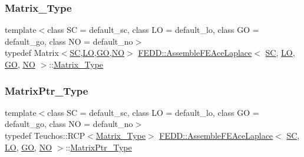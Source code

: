 \subsubsection{\texorpdfstring{Matrix\+\_\+\+Type}{Matrix\_Type}}
{\footnotesize\ttfamily template$<$class SC  = default\+\_\+sc, class LO  = default\+\_\+lo, class GO  = default\+\_\+go, class NO  = default\+\_\+no$>$ \\
typedef Matrix$<$\hyperlink{fe__test__laplace_8cpp_a79c7e86a57edbb2a5a53242bcd04e41e}{SC},\hyperlink{fe__test__laplace_8cpp_ad6a38c9f07d3fd633eefca5bccad8410}{LO},\hyperlink{fe__test__laplace_8cpp_afa2946b509009b4f45eb04bd8c5b27d9}{GO},\hyperlink{fe__test__laplace_8cpp_a5e24f37b28787429872b6ecb1d0417ce}{NO}$>$ \hyperlink{classFEDD_1_1AssembleFEAceLaplace}{F\+E\+D\+D\+::\+Assemble\+F\+E\+Ace\+Laplace}$<$ \hyperlink{fe__test__laplace_8cpp_a79c7e86a57edbb2a5a53242bcd04e41e}{SC}, \hyperlink{fe__test__laplace_8cpp_ad6a38c9f07d3fd633eefca5bccad8410}{LO}, \hyperlink{fe__test__laplace_8cpp_afa2946b509009b4f45eb04bd8c5b27d9}{GO}, \hyperlink{fe__test__laplace_8cpp_a5e24f37b28787429872b6ecb1d0417ce}{NO} $>$\+::\hyperlink{classFEDD_1_1AssembleFEAceLaplace_ad5a1d233cdc46488449047924e868010}{Matrix\+\_\+\+Type}}

\mbox{\label{classFEDD_1_1AssembleFEAceLaplace_aef601b47321c72006e231340b6b79f01}} 
\subsubsection{\texorpdfstring{Matrix\+Ptr\+\_\+\+Type}{MatrixPtr\_Type}}
{\footnotesize\ttfamily template$<$class SC  = default\+\_\+sc, class LO  = default\+\_\+lo, class GO  = default\+\_\+go, class NO  = default\+\_\+no$>$ \\
typedef Teuchos\+::\+R\+CP$<$\hyperlink{classFEDD_1_1AssembleFEAceLaplace_ad5a1d233cdc46488449047924e868010}{Matrix\+\_\+\+Type}$>$ \hyperlink{classFEDD_1_1AssembleFEAceLaplace}{F\+E\+D\+D\+::\+Assemble\+F\+E\+Ace\+Laplace}$<$ \hyperlink{fe__test__laplace_8cpp_a79c7e86a57edbb2a5a53242bcd04e41e}{SC}, \hyperlink{fe__test__laplace_8cpp_ad6a38c9f07d3fd633eefca5bccad8410}{LO}, \hyperlink{fe__test__laplace_8cpp_afa2946b509009b4f45eb04bd8c5b27d9}{GO}, \hyperlink{fe__test__laplace_8cpp_a5e24f37b28787429872b6ecb1d0417ce}{NO} $>$\+::\hyperlink{classFEDD_1_1AssembleFEAceLaplace_aef601b47321c72006e231340b6b79f01}{Matrix\+Ptr\+\_\+\+Type}}

